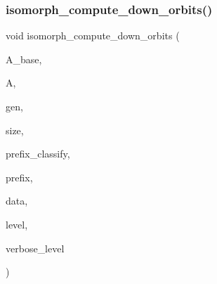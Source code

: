 \subsubsection{\texorpdfstring{isomorph\+\_\+compute\+\_\+down\+\_\+orbits()}{isomorph\_compute\_down\_orbits()}}
{\footnotesize\ttfamily void isomorph\+\_\+compute\+\_\+down\+\_\+orbits (\begin{DoxyParamCaption}\item[{\mbox{\hyperlink{classaction}{action}} $\ast$}]{A\+\_\+base,  }\item[{\mbox{\hyperlink{classaction}{action}} $\ast$}]{A,  }\item[{\mbox{\hyperlink{classgenerator}{generator}} $\ast$}]{gen,  }\item[{\mbox{\hyperlink{galois_8h_a09fddde158a3a20bd2dcadb609de11dc}{I\+NT}}}]{size,  }\item[{const \mbox{\hyperlink{galois_8h_ab6cc7b4aeb6ea31aba2b3fbfc83ff5e6}{B\+Y\+TE}} $\ast$}]{prefix\+\_\+classify,  }\item[{const \mbox{\hyperlink{galois_8h_ab6cc7b4aeb6ea31aba2b3fbfc83ff5e6}{B\+Y\+TE}} $\ast$}]{prefix,  }\item[{void $\ast$}]{data,  }\item[{\mbox{\hyperlink{galois_8h_a09fddde158a3a20bd2dcadb609de11dc}{I\+NT}}}]{level,  }\item[{\mbox{\hyperlink{galois_8h_a09fddde158a3a20bd2dcadb609de11dc}{I\+NT}}}]{verbose\+\_\+level }\end{DoxyParamCaption})}

\mbox{\label{isomorph__global_8_c_a13519b3a5d3b5ceb26b4bec6736b0086}} 
